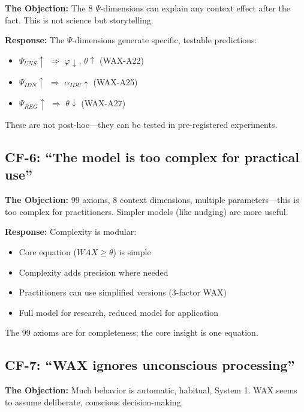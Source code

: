 \textbf{The Objection:} The 8 $\Psi$-dimensions can explain any context effect after the fact. This is not science but storytelling.

\textbf{Response:} The $\Psi$-dimensions generate specific, testable predictions:
\begin{itemize}[nosep]
    \item $\Psi_{UNS} \uparrow$ $\Rightarrow$ $\varphi \downarrow$, $\theta \uparrow$ (WAX-A22)
    \item $\Psi_{IDN} \uparrow$ $\Rightarrow$ $\alpha_{IDU} \uparrow$ (WAX-A25)
    \item $\Psi_{REG} \uparrow$ $\Rightarrow$ $\theta \downarrow$ (WAX-A27)
\end{itemize}
These are not post-hoc---they can be tested in pre-registered experiments.

\subsection{CF-6: ``The model is too complex for practical use''}

\textbf{The Objection:} 99 axioms, 8 context dimensions, multiple parameters---this is too complex for practitioners. Simpler models (like nudging) are more useful.

\textbf{Response:} Complexity is modular:
\begin{itemize}[nosep]
    \item Core equation ($WAX \geq \theta$) is simple
    \item Complexity adds precision where needed
    \item Practitioners can use simplified versions (3-factor WAX)
    \item Full model for research, reduced model for application
\end{itemize}
The 99 axioms are for completeness; the core insight is one equation.

\subsection{CF-7: ``WAX ignores unconscious processing''}

\textbf{The Objection:} Much behavior is automatic, habitual, System 1. WAX seems to assume deliberate, conscious decision-making.

